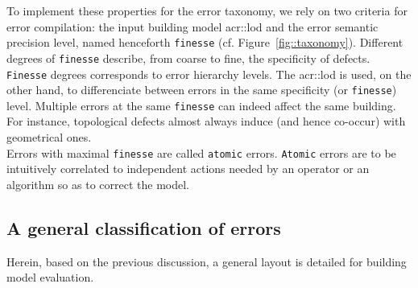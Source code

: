             To implement these properties for the error taxonomy, we rely on two criteria for error compilation: the input building model \gls{acr::lod} and the error semantic precision level, named henceforth \texttt{finesse} (cf. Figure~\ref{fig::taxonomy}).
            Different degrees of \texttt{finesse} describe, from coarse to fine, the specificity of defects.
            \texttt{Finesse} degrees corresponds to error hierarchy levels.
            The \gls{acr::lod} is used, on the other hand, to differenciate between errors in the same specificity (or \texttt{finesse}) level.
            Multiple errors at the same \texttt{finesse} can indeed affect the same building.
            For instance, topological defects almost always induce (and hence co-occur) with geometrical ones.\\
            Errors with maximal \texttt{finesse} are called \texttt{atomic} errors.
            \texttt{Atomic} errors are to be intuitively correlated to independent actions needed by an operator or an algorithm so as to correct the model.

    \subsection{A general classification of errors}
        \label{subsec::semantic_evaluation::general_framework::error_classification}
        Herein, based on the previous discussion, a general layout is detailed for building model evaluation.

